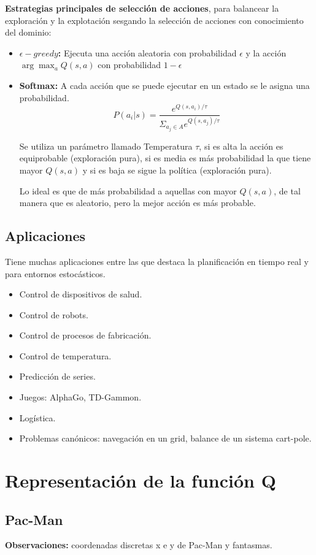\documentclass[12pt]{report} %
\begin{document}
\textbf{Estrategias principales de selección de acciones}, para balancear la exploración y la explotación sesgando la selección de acciones con conocimiento del dominio:
\begin{itemize}
  \item \textbf{$\epsilon-greedy$:} Ejecuta una acción aleatoria con probabilidad $\epsilon$ y la acción $\arg \max_a Q(s, a)$ con probabilidad $1-\epsilon$
  \item \textbf{Softmax:} A cada acción que se puede ejecutar en un estado se le asigna una probabilidad.
  $$ P(a_i|s)= \frac{e^{Q(s, a_i)/\tau}} {\Sigma_{a_j \in A} e^{Q(s, a_j)/\tau}} $$
  
  Se utiliza un parámetro llamado Temperatura $\tau$, si es alta la acción es equiprobable (exploración pura), si es media es más probabilidad la que tiene mayor $Q(s, a)$ y si es baja se sigue la política (exploración pura).

  Lo ideal es que de más probabilidad a aquellas con mayor $Q(s, a)$, de tal manera que es aleatorio, pero la mejor acción es más probable.
\end{itemize}

\subsection{Aplicaciones}
Tiene muchas aplicaciones entre las que destaca la planificación en tiempo real y para entornos estocásticos.
\begin{itemize}
  \item Control de dispositivos de salud.
  \item Control de robots.
  \item Control de procesos de fabricación.
  \item Control de temperatura.
  \item Predicción de series.
  \item Juegos: AlphaGo, TD-Gammon.
  \item Logística.
  \item Problemas canónicos: navegación en un grid, balance de un sistema cart-pole.
\end{itemize}

\section{Representación de la función Q}
\subsection{Pac-Man}
\textbf{Observaciones:} coordenadas discretas x e y de Pac-Man y fantasmas.
\end{document}
